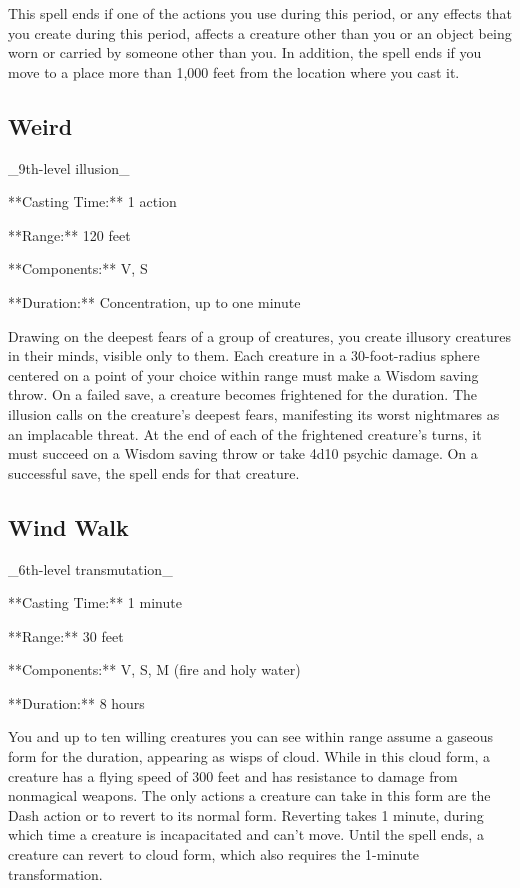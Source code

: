 This spell ends if one of the actions you use during this period, or any effects that you create during this period, affects a creature other than you or an object being worn or carried by someone other than you. In addition, the spell ends if you move to a place more than 1,000 feet from the location where you cast it.

\subsection{Weird}

_9th-level illusion_

**Casting Time:** 1 action

**Range:** 120 feet

**Components:** V, S

**Duration:** Concentration, up to one minute

Drawing on the deepest fears of a group of creatures, you create illusory creatures in their minds, visible only to them. Each creature in a 30-foot-radius sphere centered on a point of your choice within range must make a Wisdom saving throw. On a failed save, a creature becomes frightened for the duration. The illusion calls on the creature’s deepest fears, manifesting its worst nightmares as an implacable threat. At the end of each of the frightened creature’s turns, it must succeed on a Wisdom saving throw or take 4d10 psychic damage. On a successful save, the spell ends for that creature.

\subsection{Wind Walk}

_6th-level transmutation_

**Casting Time:** 1 minute

**Range:** 30 feet

**Components:** V, S, M (fire and holy water)

**Duration:** 8 hours

You and up to ten willing creatures you can see within range assume a gaseous form for the duration, appearing as wisps of cloud. While in this cloud form, a creature has a flying speed of 300 feet and has resistance to damage from nonmagical weapons. The only actions a creature can take in this form are the Dash action or to revert to its normal form. Reverting takes 1 minute, during which time a creature is incapacitated and can’t move. Until the spell ends, a creature can revert to cloud form, which also requires the 1-minute transformation.

